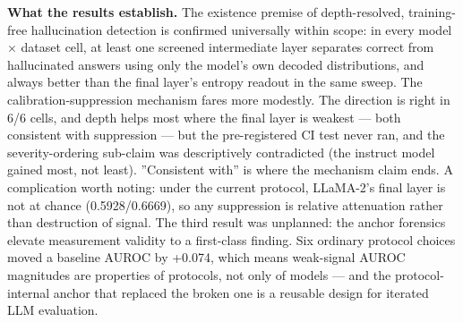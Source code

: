 
\textbf{What the results establish.} The existence premise of depth-resolved, training-free hallucination detection is confirmed universally within scope: in every model $\times$ dataset cell, at least one screened intermediate layer separates correct from hallucinated answers using only the model's own decoded distributions, and always better than the final layer's entropy readout in the same sweep. The calibration-suppression mechanism fares more modestly. The direction is right in 6/6 cells, and depth helps most where the final layer is weakest --- both consistent with suppression --- but the pre-registered CI test never ran, and the severity-ordering sub-claim was descriptively contradicted (the instruct model gained most, not least). ''Consistent with'' is where the mechanism claim ends. A complication worth noting: under the current protocol, LLaMA-2's final layer is not at chance (0.5928/0.6669), so any suppression is relative attenuation rather than destruction of signal. The third result was unplanned: the anchor forensics elevate measurement validity to a first-class finding. Six ordinary protocol choices moved a baseline AUROC by +0.074, which means weak-signal AUROC magnitudes are properties of protocols, not only of models --- and the protocol-internal anchor that replaced the broken one is a reusable design for iterated LLM evaluation.

